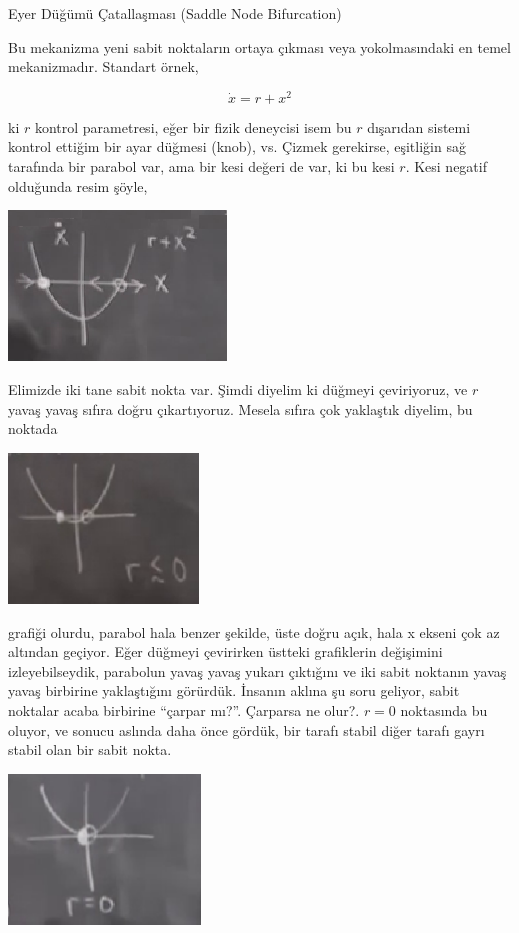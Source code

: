 \documentclass[12pt,fleqn]{article}\usepackage{../../common}
\begin{document}
Eyer Düğümü Çatallaşması (Saddle Node Bifurcation)

Bu mekanizma yeni sabit noktaların ortaya çıkması veya yokolmasındaki en temel
mekanizmadır. Standart örnek,

$$ \dot{x} = r + x^2 $$

ki $r$ kontrol parametresi, eğer bir fizik deneycisi isem bu $r$ dışarıdan
sistemi kontrol ettiğim bir ayar düğmesi (knob), vs. Çizmek gerekirse, eşitliğin
sağ tarafında bir parabol var, ama bir kesi değeri de var, ki bu kesi $r$. Kesi
negatif olduğunda resim şöyle, 

\includegraphics[height=4cm]{02_10.png}

Elimizde iki tane sabit nokta var. Şimdi diyelim ki düğmeyi çeviriyoruz, ve $r$
yavaş yavaş sıfıra doğru çıkartıyoruz. Mesela sıfıra çok yaklaştık diyelim, bu
noktada

\includegraphics[height=4cm]{02_11.png}

grafiği olurdu, parabol hala benzer şekilde, üste doğru açık, hala x ekseni çok
az altından geçiyor. Eğer düğmeyi çevirirken üstteki grafiklerin değişimini
izleyebilseydik, parabolun yavaş yavaş yukarı çıktığını ve iki sabit noktanın
yavaş yavaş birbirine yaklaştığını görürdük. İnsanın aklına şu soru
geliyor, sabit noktalar acaba birbirine ``çarpar mı?''. Çarparsa ne olur?. $r=0$
noktasında bu oluyor, ve sonucu aslında daha önce gördük, bir tarafı stabil
diğer tarafı gayrı stabil olan bir sabit nokta. 

\includegraphics[height=4cm]{02_12.png}
\end{document}
